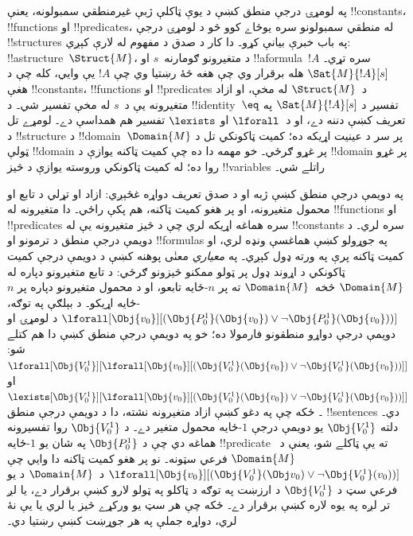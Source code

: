 \documentclass[../../../include/open-logic-section]{subfiles}
\begin{document}


په لومړۍ درجې منطق کښې د يوې ټاکلې ژبې غيرمنطقي سمبولونه، يعنې
!!{constant}s، !!{function}s او !!{predicate}s، له منطقي سمبولونو
سره يوځاے کوو څو د لومړۍ درجې !!{structure}s په باب خبرې بيانې کړو۔
دا کار د صدق د مفهوم له لارې کېږي: !!a{structure}~$\Struct{M}$، د
متغيرونو ګومارنه~$s$ او !!a{formula}~$!A$ سره تړي۔ $\Sat{M}{!A}[s]$
هله برقرار وي چې هغه څۀ رښتيا وي چې $!A$ يې وايي، کله چې د هغې
!!{constant}s، !!{function}s او !!{predicate}s د~$\Struct{M}$ له
مخې، او ازاد متغيرونه يې د~$s$ له مخې تفسير شي۔ د !!{identity}~$\eq$
تفسير د $\Sat{M}{!A}[s]$ په تعريف کښې دننه دے، او د~$\lforall$ او
$\lexists$ تفسير هم همداسې دے۔ لومړے تل د !!{structure} د
!!{domain}~$\Domain{M}$ پر سر د عينيت اړيکه ده؛ کميت ټاکونکي تل د
ټولې !!{domain} پر غړو ګرځي۔ خو مهمه دا ده چې کميت ټاکنه يوازې د
!!{domain} پر غړو روا ده؛ له کميت ټاکونکي وروسته يوازې د څيز
!!{variable}s راتلے شي۔

په دويمې درجې منطق کښې ژبه او د صدق تعريف دواړه غځېږي: ازاد او تړلي
د تابع او محمول متغيرونه، او پر هغو کميت ټاکنه، هم پکې راځي۔ دا
متغيرونه له !!{function}s او !!{predicate}s سره هماغه اړيکه لري چې
د څيز متغيرونه يې له !!{constant}s سره لري۔ د دويمې درجې منطق د
ترمونو او !!{formula}s په جوړولو کښې هماغسې ونډه لري، او کميت ټاکنه
پرې په ورته ډول کېږي۔ په \emph{معياري} معنٰی پوهنه کښې د دويمې درجې
کميت ټاکونکي د اړوند ډول پر ټولو ممکنو څيزونو ګرځي: د تابع متغيرونو
دپاره له $\Domain{M}$ څخه~$\Domain{M}$ ته پر $n$-ځايه تابعو، او د
محمول متغيرونو دپاره پر $n$-ځايه اړيکو۔ د بېلګې په توګه،
$\lforall[\Obj{v_0}][(\Obj{P^1_0}(\Obj{v_0}) \lor \lnot
  \Obj{P^1_0}(\Obj{v_0}))]$ د لومړۍ او دويمې درجې دواړو منطقونو
فارمولا ده؛ خو په دويمې درجې منطق کښې دا هم کتلے شو:
$\lforall[\Obj{V^1_0}][\lforall[\Obj{v_0}][(\Obj{V^1_0}(\Obj{v_0}) \lor
    \lnot \Obj{V^1_0}(\Obj{v_0}))]]$ او
$\lexists[\Obj{V^1_0}][\lforall[\Obj{v_0}][(\Obj{V^1_0}(\Obj{v_0}) \lor
    \lnot \Obj{V^1_0}(\Obj{v_0}))]]$۔ ځکه چې په دغو کښې ازاد
متغيرونه نشته، دا د دويمې درجې منطق !!{sentence}s دي۔ دلته
$\Obj{V^1_0}$ يو دويمې درجې $1$-ځايه محمول متغير دے۔ د
$\Obj{V^1_0}$ روا تفسيرونه هماغه دي چې د $\Obj{P^1_0}$ په شان
يو $1$-ځايه !!{predicate} ته يې ټاکلے شو، يعنې د~$\Domain{M}$
فرعي سټونه۔ نو پر هغو کميت ټاکنه دا وايي چې
$\lforall[\Obj{v_0}][(\Obj{V^1_0}(\Obj v_0) \lor \lnot
  \Obj{V^1_0}(v_0))]$ د~$\Domain{M}$ د يو فرعي سټ د
$\Obj{V^1_0}$ د ارزښت په توګه د ټاکلو په ټولو لارو کښې برقرار دے،
يا لږ تر لږه په يوه لاره کښې برقرار دے۔ ځکه چې هر سټ يو ورکړے څيز
يا لري يا يې نۀ لري، دواړه جملې په هر جوړښت کښې رښتيا دي۔
\end{document}
